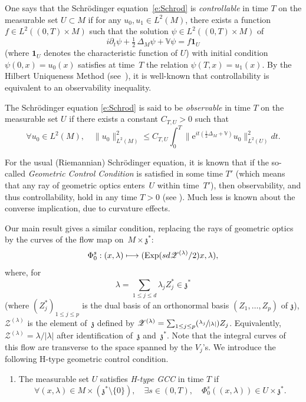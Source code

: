 \documentclass[JEP,XML,SOM,Unicode,published]{cedram}
\let\mathcal\mathscr
\newcommand\mto{\mathchoice{\longmapsto}{\mapsto}{\mapsto}{\mapsto}}
\newcommand{\Psfrac}[2]{(\sfrac{#1}{#2})}
\newcommand{\rme}{\mathrm{e}}
\newcommand{\bun}{\mathbf{1}}
\DeclareMathOperator{\Exp}{Exp}
\theoremstyle{plain}
\theoremstyle{definition}
\def\bbV{{\mathbb V}}
\begin{document}
One says that the Schrödinger equation~\eqref{e:Schrod} is \emph{controllable} in time $T$ on the measurable set $U\subset M$ if for any
$u_0,u_1\in L^2(M)$, there exists a function $f\in L^2((0,T)\times M)$ such that the solution $\psi\in L^2((0,T)\times M)$ of
\[
i\partial_t \psi+\tfrac 12\, \Delta_M \psi+\bbV\psi=f\bun_U
\]
(where $\bun_U$ denotes the characteristic function of $U$) with initial condition $\psi(0,x)=u_0(x)$ satisfies at time~$T$ the relation $\psi(T,x)=u_1(x).$
By the Hilbert Uniqueness Method (see~\cite{JLL}), it is well-known that controllability is equivalent to an observability inequality.

The Schrödinger equation \eqref{e:Schrod} is said to be \emph{observable} in time $T$ on the measurable set $U$ if there exists a constant $C_{T,U}>0$ such that
\begin{equation}\label{obs}
\forall u_0\in L^2(M),\quad \|u_0\|^2_{L^2(M)} \leq C_{T,U} \int_0^T \bigl\| \rme^{it(\frac12 \Delta_M+\bbV)} u_0\bigr\|^2_{L^2(U)} dt.
\end{equation}

For the usual (Riemannian) Schrödinger equation, it is known that if the so-called \emph{Geometric Control Condition} is satisfied in some time $T'$ (which means that any ray of geometric optics enters~$U$ within time~$T'$), then observability, and thus controllability, hold in any time $T>0$ (see \cite{Leb}). Much less is known about the converse implication, due to curvature effects.

Our main result
gives a similar condition, replacing the rays of geometric optics by the curves of the flow map on~$M\times \mathfrak z^*$:
\[
\Phi^s_0: (x,\lambda)\mto (\Exp (sd\mathcal Z^{(\lambda)}/2)x,\lambda),
\]
where, for
\[
\lambda= \sum_{1\leq j\leq d } \lambda_j Z_j^*\in\mathfrak z^*
\]
(where $(Z_j^*)_{1\leq j\leq p}$ is the dual basis of an ortho\-normal basis $(Z_1,\dots,Z_p)$ of $\mathfrak z$), $\mathcal Z^{(\lambda)}$ is the element of~$\mathfrak z$ defined by
$\mathcal Z^{(\lambda)} = \sum_{1\leq j\leq p} \Psfrac{\lambda_j}{|\lambda| }Z_j$. Equivalently, $\mathcal Z^{(\lambda)}= \lambda/|\lambda|$ after identification of~$\mathfrak z$ and~$\mathfrak z^*$.
Note that the integral curves of this flow are transverse to the space spanned by the $V_j$'s.
We introduce the following H-type geometric control condition.

\begin{enumerate}\renewcommand{\theenumi}{H-GCC}
\item\label{H-GCC}
The measurable set $U$ satisfies \emph{H-type GCC} in time $T$ if
\[
\forall (x,\lambda)\in M\times(\mathfrak z^*\setminus\{0\}),\quad \exists s\in (0,T),\quad \Phi^{s}_0 ((x,\lambda))\in U\times \mathfrak z^*.
\]
\end{enumerate}
\end{document}
